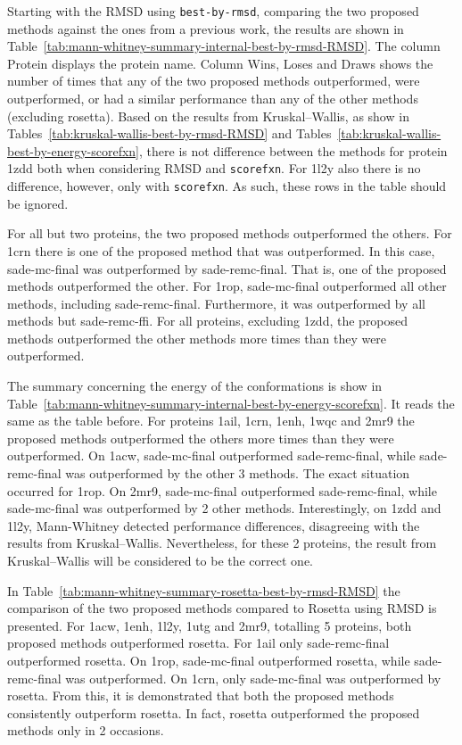 

Starting with the RMSD using \texttt{best-by-rmsd}, comparing the two proposed
methods against the ones from a previous work, the results are shown in
Table~\ref{tab:mann-whitney-summary-internal-best-by-rmsd-RMSD}. The column
Protein displays the protein name. Column Wins, Loses and Draws shows the number
of times that any of the two proposed methods outperformed, were outperformed,
or had a similar performance than any of the other methods (excluding rosetta).
Based on the results from Kruskal–Wallis, as show in
Tables~\ref{tab:kruskal-wallis-best-by-rmsd-RMSD} and
Tables~\ref{tab:kruskal-wallis-best-by-energy-scorefxn}, there is not
difference between the methods for protein 1zdd both when considering RMSD and
\texttt{scorefxn}. For 1l2y also there is no difference, however, only with
\texttt{scorefxn}. As such, these rows in the table should be ignored.

For all but two proteins, the two proposed methods outperformed the others. For
1crn there is one of the proposed method that was outperformed. In this case,
sade-mc-final was outperformed by sade-remc-final. That is, one of the proposed
methods outperformed the other. For 1rop, sade-mc-final outperformed all other
methods, including sade-remc-final. Furthermore, it was outperformed by all
methods but sade-remc-ffi. For all proteins, excluding 1zdd, the proposed
methods outperformed the other methods more times than they were outperformed.

The summary concerning the energy of the conformations is show in
Table~\ref{tab:mann-whitney-summary-internal-best-by-energy-scorefxn}. It
reads the same as the table before. For proteins 1ail, 1crn, 1enh, 1wqc and 2mr9
the proposed methods outperformed the others more times than they were
outperformed. On 1acw, sade-mc-final outperformed sade-remc-final, while
sade-remc-final was outperformed by the other 3 methods. The exact situation
occurred for 1rop. On 2mr9, sade-mc-final outperformed sade-remc-final, while
sade-mc-final was outperformed by 2 other methods. Interestingly, on 1zdd
and 1l2y, Mann-Whitney detected performance differences, disagreeing with
the results from Kruskal–Wallis. Nevertheless, for these 2 proteins, the result
from Kruskal–Wallis will be considered to be the correct one.



In Table~\ref{tab:mann-whitney-summary-rosetta-best-by-rmsd-RMSD} the
comparison of the two proposed methods compared to Rosetta using RMSD is
presented. For 1acw, 1enh, 1l2y, 1utg and 2mr9, totalling 5 proteins, both
proposed methods outperformed rosetta. For 1ail only sade-remc-final
outperformed rosetta. On 1rop, sade-mc-final outperformed rosetta, while
sade-remc-final was outperformed. On 1crn, only sade-mc-final was outperformed
by rosetta. From this, it is demonstrated that both the proposed methods
consistently outperform rosetta. In fact, rosetta outperformed the proposed
methods only in 2 occasions.

